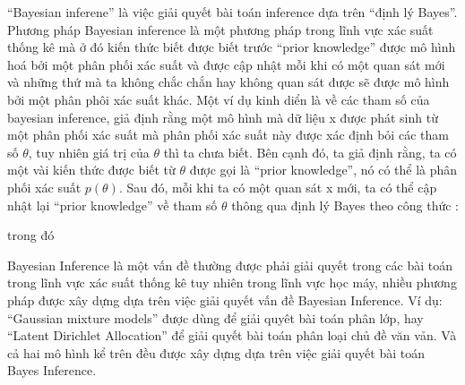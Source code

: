         ``Bayesian inferene'' là việc giải quyết bài toán inference dựa trên ``định lý Bayes''. Phương pháp Bayesian inference là một phương pháp trong lĩnh vực xác suất thống kê mà ở đó kiến thức biết được biết trước ``prior knowledge'' được mô hình hoá bởi một phân phối xác suất và được cập nhật mỗi khi có một quan sát mới và những thứ mà ta không chắc chắn hay không quan sát được sẽ được mô hình bởi một phân phôi xác suất khác. Một ví dụ kinh diển là về các tham số của bayesian inference, giả định rằng một mô hình mà dữ liệu x được phát sinh từ một phân phối xác suất mà phân phối xác suất này được xác định bỏi các tham số $\theta$, tuy nhiên giá trị của $\theta$ thì ta chưa biết. Bên cạnh đó, ta giả định rằng, ta có một vài kiến thức được biết từ $\theta$ được gọi là ``prior knowledge'', nó có thể là phân phối xác suất $p(\theta)$. Sau đó, mỗi khi ta có một quan sát x mới, ta có thể cập nhật lại ``prior knowledge'' về tham số $\theta$ thông qua định lý Bayes theo công thức :

        trong đó 

        
        Bayesian Inference là một vấn đề thường được phải giải quyết trong các bài toán trong lĩnh vực xác suất thống kê tuy nhiên trong lĩnh vực học máy, nhiều phương pháp được xây dựng dựa trên việc giải quyết vấn đề Bayesian Inference. Ví dụ: ``Gaussian mixture models'' được dùng để giải quyêt bài toán phân lớp, hay ``Latent Dirichlet Allocation'' để giải quyết bài toán phân loại chủ đề văn vản. Và cả hai mô hình kể trên đều được xây dựng dựa trên việc giải quyết bài toán Bayes Inference.  




